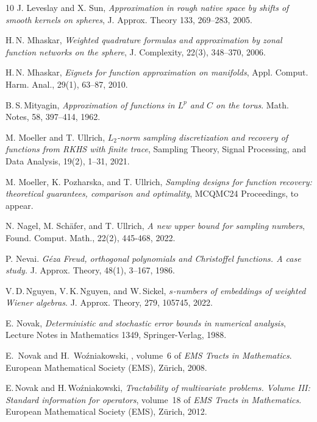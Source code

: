 \documentclass[a4paper,12pt]{amsart}
\theoremstyle{definition}
\theoremstyle{remark}
\begin{document}
{\begin{thebibliography}{10}
J. Leveslay and X. Sun, {\it Approximation in rough native space by shifts of smooth kernels on spheres}, J. Approx. Theory
133, 269--283, 2005.



H.\,N. Mhaskar, {\it Weighted quadrature formulas and approximation by zonal function networks on the sphere}, J. Complexity, 22(3), 348–370, 2006.

H.\,N. Mhaskar, {\it Eignets for function approximation on manifolds},
Appl. Comput. Harm. Anal.,
29(1), 63--87, 2010.


 B.\,S.\,Mityagin, {\it Approximation of functions in $L^p$ and $C$ on the torus}.
Math. Notes, 58, 397--414, 1962.

 M. Moeller and T. Ullrich, {\it $L_2$-norm sampling discretization and recovery of functions from RKHS with finite trace}, Sampling Theory, Signal Processing, and Data Analysis, 19(2), 1--31, 2021.

M. Moeller, K. Pozharska, and T. Ullrich, {\it Sampling designs for function recovery: theoretical guarantees, comparison and optimality}, MCQMC24 Proceedings, to appear.

 N. Nagel, M. Sch\"afer, and T. Ullrich,
{\it A new upper bound for sampling numbers}, Found. Comput. Math., 22(2), 445-468, 2022.

 P. Nevai. 
\emph{G\'eza Freud, orthogonal polynomials and Christoffel functions. A case study. } J.
Approx. Theory, 48(1), 3--167, 1986.


 V.\,D.\,Nguyen, V.\,K.\,Nguyen, and W.\,Sickel, {\it $s$-numbers of embeddings of weighted
Wiener algebras}. J. Approx. Theory, 279, 105745, 2022.


 E. Novak, {\it Deterministic and stochastic error bounds in numerical analysis},
Lecture Notes in Mathematics 1349, Springer-Verlag, 1988.



E.~Novak and H.~Wo\'zniakowski,
, volume~6 of {\em EMS Tracts in Mathematics}.
\newblock European Mathematical Society (EMS), Z\"urich, 2008.


 E.\,Novak and H.\,Wo\'zniakowski, {\it Tractability of multivariate problems. Volume III: Standard information for operators},
volume~18 of {\em EMS Tracts in Mathematics}.
\newblock European Mathematical Society (EMS), Z\"urich, 2012.



\end{thebibliography}}
\end{document}
